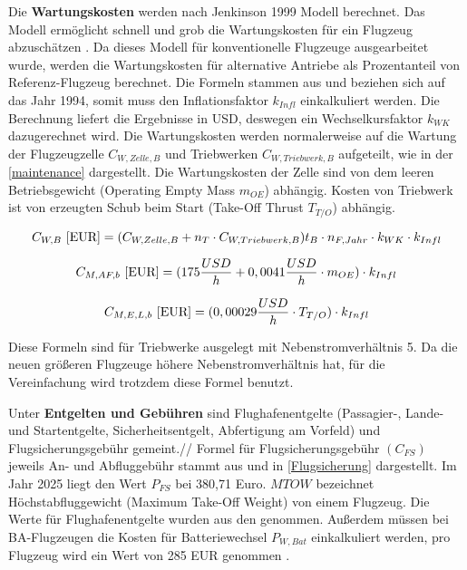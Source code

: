 Die \textbf{Wartungskosten} werden nach Jenkinson 1999 Modell berechnet. Das Modell ermöglicht schnell und grob die Wartungskosten 
für ein Flugzeug abzuschätzen \cite{bruge2018wartungskosten}.
Da dieses Modell für konventionelle Flugzeuge ausgearbeitet wurde, werden die Wartungskosten für alternative Antriebe
als Prozentanteil von Referenz-Flugzeug berechnet. 
Die Formeln stammen aus \cite{bruge2018wartungskosten} und beziehen sich auf das Jahr 1994, somit muss den Inflationsfaktor $k_{Infl}$
einkalkuliert werden. Die Berechnung liefert die Ergebnisse in USD, deswegen ein Wechselkursfaktor $k_{WK}$ dazugerechnet wird.
Die Wartungskosten werden normalerweise auf die Wartung der Flugzeugzelle $C_{W,Zelle,B}$ und Triebwerken 
$C_{W,Triebwerk,B}$ aufgeteilt, wie in der \eqref{maintenance} dargestellt. Die Wartungskosten der Zelle sind von dem leeren Betriebsgewicht 
(Operating Empty Mass $m_{OE}$) abhängig. Kosten von Triebwerk ist von erzeugten Schub beim Start (Take-Off Thrust $T_{T/O}$) abhängig.

\begin{equation}
   {C_{W,B} ~[\text{EUR}]} = (C_{W,Zelle,B} + n_{T} \cdot C_{W,Triebwerk,B} ) t_{B} \cdot n_{F, Jahr} \cdot k_{WK} \cdot k_{Infl}\\
   \label{maintenance}
\end{equation}

\begin{equation}
   {C_{M,AF,b} ~[\text{EUR}]} = (175 \frac{USD}{h} + 0,0041 \frac{USD}{h} \cdot m_{OE} )\cdot k_{Infl}\\
   \label{maintenance Zelle}
\end{equation}

\begin{equation}
   {C_{M,E,L,b} ~[\text{EUR}]} = (0,00029 \frac{USD}{h} \cdot T_{T/O} )\cdot k_{Infl}\\
   \label{maintenance engine}
\end{equation}

Diese Formeln sind für Triebwerke ausgelegt mit Nebenstromverhältnis 5. Da die neuen größeren Flugzeuge höhere Nebenstromverhältnis hat,
für die Vereinfachung wird trotzdem diese Formel benutzt.


Unter \textbf{Entgelten und Gebühren} sind Flughafenentgelte (Passagier-, Lande- und Startentgelte, Sicherheitsentgelt, Abfertigung am 
Vorfeld) und Flugsicherungsgebühr gemeint.//
Formel für Flugsicherungsgebühr $(C_{FS})$ jeweils An- und Abfluggebühr stammt aus \cite{dfs_flugsicherungsgebuehren} und in \eqref{Flugsicherung}
dargestellt. Im Jahr 2025 liegt den Wert $P_{FS}$ bei 380,71 Euro. $MTOW$ bezeichnet Höchstabfluggewicht (Maximum Take-Off Weight) 
von einem Flugzeug. Die Werte für Flughafenentgelte wurden aus den \cite{fraport2025entgelte} genommen.
Außerdem müssen bei BA-Flugzeugen die Kosten für
Batteriewechsel $P_{W,Bat}$ einkalkuliert werden, pro Flugzeug wird ein Wert von 285 EUR genommen \cite{guo2023infrastructure}.

